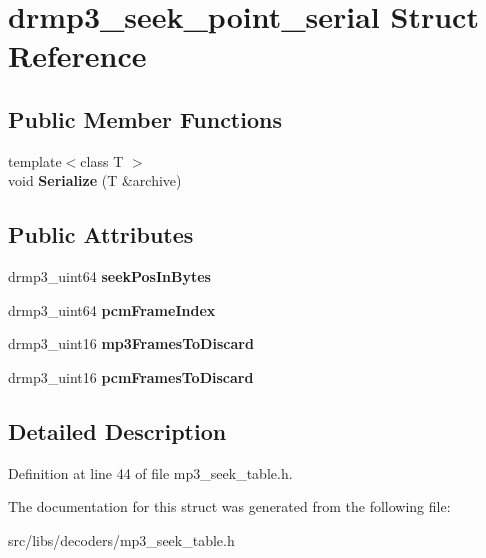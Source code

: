 \hypertarget{structdrmp3__seek__point__serial}{\section{drmp3\-\_\-seek\-\_\-point\-\_\-serial Struct Reference}
\label{structdrmp3__seek__point__serial}
}
\subsection*{Public Member Functions}
\begin{DoxyCompactItemize}
\item 
\hypertarget{structdrmp3__seek__point__serial_aef558157a0b74a010b8911f6314b8180}{{\footnotesize template$<$class T $>$ }\\void {\bfseries Serialize} (T \&archive)}\label{structdrmp3__seek__point__serial_aef558157a0b74a010b8911f6314b8180}

\end{DoxyCompactItemize}
\subsection*{Public Attributes}
\begin{DoxyCompactItemize}
\item 
\hypertarget{structdrmp3__seek__point__serial_a25ebe058bfb25339227014e4816aeacc}{drmp3\-\_\-uint64 {\bfseries seek\-Pos\-In\-Bytes}}\label{structdrmp3__seek__point__serial_a25ebe058bfb25339227014e4816aeacc}

\item 
\hypertarget{structdrmp3__seek__point__serial_a7e6188d72be5e819a42028162538da44}{drmp3\-\_\-uint64 {\bfseries pcm\-Frame\-Index}}\label{structdrmp3__seek__point__serial_a7e6188d72be5e819a42028162538da44}

\item 
\hypertarget{structdrmp3__seek__point__serial_ac0ac8cbabd44edd5299b9c0f3e3fd47b}{drmp3\-\_\-uint16 {\bfseries mp3\-Frames\-To\-Discard}}\label{structdrmp3__seek__point__serial_ac0ac8cbabd44edd5299b9c0f3e3fd47b}

\item 
\hypertarget{structdrmp3__seek__point__serial_a2863587ab410bbd2bb9f584da59ee06b}{drmp3\-\_\-uint16 {\bfseries pcm\-Frames\-To\-Discard}}\label{structdrmp3__seek__point__serial_a2863587ab410bbd2bb9f584da59ee06b}

\end{DoxyCompactItemize}


\subsection{Detailed Description}


Definition at line 44 of file mp3\-\_\-seek\-\_\-table.\-h.



The documentation for this struct was generated from the following file\-:\begin{DoxyCompactItemize}
\item 
src/libs/decoders/mp3\-\_\-seek\-\_\-table.\-h\end{DoxyCompactItemize}
